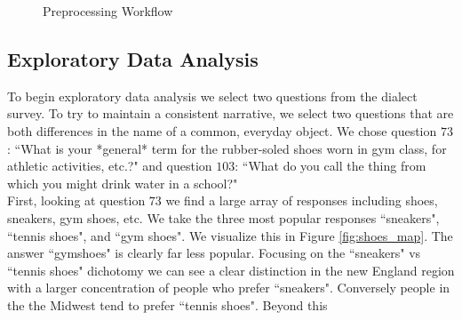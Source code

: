 \documentclass[10pt,letterpaper]{article}
\begin{document}
\begin{figure}
    \centering
    \caption{Preprocessing Workflow}
    \label{fig:preprocessing}
\end{figure}

\subsection{Exploratory Data Analysis}\label{data-exploration}
To begin exploratory data analysis we select two questions from the dialect survey. To try to maintain a consistent narrative, we select two questions that are both differences in the name of a common, everyday object. We chose question $73$: ``What is your *general* term for the rubber-soled shoes worn in gym class, for athletic activities, etc.?" and question $103$: ``What do you call the thing from which you might drink water in a school?"\\

First, looking at question $73$ we find a large array of responses including shoes, sneakers, gym shoes, etc. We take the three most popular responses ``sneakers", ``tennis shoes", and ``gym shoes". We visualize this in Figure \ref{fig:shoes_map}. The answer ``gymshoes" is clearly far less popular. Focusing on the ``sneakers" vs ``tennis shoes" dichotomy we can see a clear distinction in the new England region with a larger concentration of people who prefer ``sneakers". Conversely people in the the Midwest tend to prefer ``tennis shoes". Beyond this 
\end{document}
